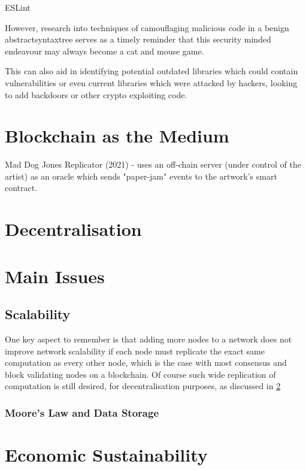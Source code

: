 \todo ESLint


However, research into techniques of camouflaging malicious code in a benign \gls{abstractsyntaxtree}
\cite{fassHideNoSeekCamouflagingMalicious2019} serves as a timely reminder that this security minded endeavour may always become a cat and mouse game.


This can also aid in identifying potential outdated libraries which could contain vulnerabilities or even current libraries which were attacked by hackers, looking to add backdoors or other crypto exploiting code.







\section{Blockchain as the Medium}

Mad Dog Jones Replicator (2021) - uses an off-chain server (under control of the artist) as an oracle which sends "paper-jam" events to the artwork's smart contract.

\section{Decentralisation}
\label{sec:lit_review:decentralisation}

\section{Main Issues}

\subsection{Scalability}

One key aspect to remember is that adding more nodes to a network does not improve network scalability if each node must replicate the exact same computation as every other node, which is the case with most consensus and block validating nodes on a blockchain. Of course such wide replication of computation is still desired, for decentralisation purposes, as discussed in \ref{sec:lit_review:decentralisation}


\subsubsection{Moore's Law and Data Storage}

\section{Economic Sustainability}

